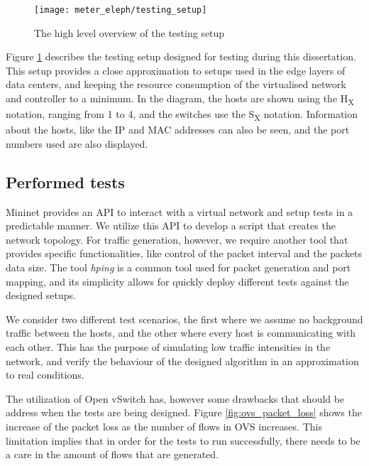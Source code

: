 \pagebreak

\begin{figure} 
    \centering
    \texttt{[image: meter\_eleph/testing\_setup]}
    \caption {The high level overview of the testing setup}
    \label{fig:test_setup}
\end{figure} 

\par Figure \ref{fig:test_setup} describes the testing setup designed for testing during this dissertation. This setup provides a close approximation to setups used
in the edge layers of data centers, and keeping the resource consumption of the virtualised network and controller to a minimum. In the diagram, the hosts are shown
using the H\textsubscript{X} notation, ranging from 1 to 4, and the switches use the S\textsubscript{X} notation. Information about the hosts, like the IP and MAC
addresses can also be seen, and the port numbers used are also displayed.

\subsection{Performed tests}

Mininet provides an API to interact with a virtual network and setup tests in a predictable manner. We utilize this API to develop a script that creates the network
topology. For traffic generation, however, we require another tool that provides specific functionalities, like control of the packet interval and the packets data
size. The tool \textit{hping} is a common tool used for packet generation and port mapping, and its simplicity allows for quickly deploy different tests
against the designed setups.

\par We consider two different test scenarios, the first where we assume no background traffic between the hosts, and the other where every host is communicating
with each other. This has the purpose of simulating low traffic intensities in the network, and verify the behaviour of the designed algorithm in an
approximation to real conditions.

\par The utilization of Open vSwitch has, however some drawbacks that should be address when the tests are being designed. Figure \ref{fig:ovs_packet_loss} shows
the increase of the packet loss as the number of flows in OVS increases. This limitation implies that in order for the tests to run successfully, there needs to be
a care in the amount of flows that are generated.

